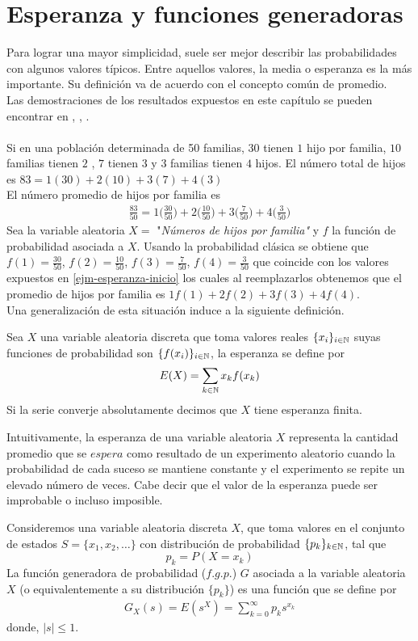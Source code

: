 \section{Esperanza y funciones generadoras}
Para lograr una mayor simplicidad, suele ser mejor describir las probabilidades con algunos valores típicos. Entre aquellos valores, la media o esperanza es la más importante. Su definición va de acuerdo con el concepto común de promedio. \\Las demostraciones de los resultados expuestos en este capítulo se pueden encontrar en \cite{Rincon1}, \cite{Rincon2},  \cite{Feller}.
\\\\
Si en una población determinada de 50 familias, $30$ tienen $1$ hijo por familia, $10$ familias tienen $2$ , $7$ tienen $3$ y $3$ familias tienen $4$ hijos. El número total de hijos es $83=1(30)+2(10)+3(7)+4(3)$\\
El número promedio de hijos por familia es 
\begin{eqnarray}
    \label{ejm-esperanza-inicio}
    \frac{83}{50}= 1\big(\frac{30}{50}\big)+2\big(\frac{10}{50}\big)+3\big(\frac{7}{50}\big)+4\big(\frac{3}{50}\big)
\end{eqnarray}
Sea la variable aleatoria $X=$ "\textit{Números de hijos por familia"} y $f$ la función de probabilidad asociada a $X$. Usando la probabilidad clásica se obtiene que $f(1)=\frac{30}{50}$, $f(2)=\frac{10}{50}$, $f(3)=\frac{7}{50}$, $f(4)=\frac{3}{50}$ que coincide con los valores expuestos en \ref{ejm-esperanza-inicio} los cuales al reemplazarlos obtenemos que el promedio de hijos por familia es $1f(1)+2f(2)+3f(3)+4f(4)$.\\
Una generalización de esta situación induce a la siguiente definición.
\begin{Def}
    Sea $X$ una variable aleatoria discreta que toma valores reales $\{x_i\}_{i\in{\mathbb{N}}}$ suyas funciones de probabilidad son $\{f(x_i)\}_{i\in{\mathbb{N}}}$, la esperanza se define por $$E(X)=\sum_{k\in{\mathbb{N}}} x_k f(x_k)$$ Si la serie converje absolutamente decimos que $X$ tiene esperanza finita.
\end{Def}
Intuitivamente, la esperanza de una variable aleatoria $X$ representa la cantidad promedio que se $espera$ como resultado de un experimento aleatorio cuando la probabilidad de cada suceso se mantiene constante y el experimento se repite un elevado número de veces. Cabe decir que el valor de la esperanza puede ser improbable o incluso imposible. 
\begin{Def}
    \label{def-prob-funcionGeneraProb}
    Consideremos una variable aleatoria discreta $X$, que toma valores en el conjunto de estados $S=\{x_1,x_2,\ldots\}$ con distribución de probabilidad $\{p_k\}_{k\in{\mathbb{N}}}$, tal que $$p_k=P(X=x_k)$$ 
    La función generadora de probabilidad ($f.g.p.$) $G$ asociada a la variable aleatoria $X$ (o equivalentemente a su distribución $\{p_k\}$) es una función que se define por 
    \begin{eqnarray}
        G_X(s)=E(s^X)=\sum_{k=0}^\infty p_k s^{x_k} \label{def-funcionGeneradoraProb}
    \end{eqnarray} 
    donde,  $|s|\leq 1$.
\end{Def}
